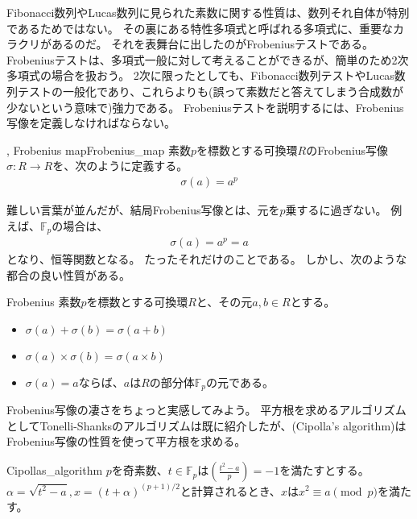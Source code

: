 Fibonacci数列やLucas数列に見られた素数に関する性質は、数列それ自体が特別であるためではない。
その裏にある特性多項式と呼ばれる多項式に、重要なカラクリがあるのだ。
それを表舞台に出したのがFrobeniusテストである。
Frobeniusテストは、多項式一般に対して考えることができるが、簡単のため2次多項式の場合を扱おう。
2次に限ったとしても、Fibonacci数列テストやLucas数列テストの一般化であり、これらよりも(誤って素数だと答えてしまう合成数が少ないという意味で)強力である。
Frobeniusテストを説明するには、Frobenius写像を定義しなければならない。

\begin{Defi}{, Frobenius map}{Frobenius_map}
素数$p$を標数とする可換環$R$のFrobenius写像$\sigma:R\to R$を、次のように定義する。
\begin{align*}
\sigma(a) = a^p
\end{align*}
\end{Defi}

難しい言葉が並んだが、結局Frobenius写像とは、元を$p$乗するに過ぎない。
例えば、$\mathbb{F}_p$の場合は、
\begin{align*}
\sigma(a) = a^p = a
\end{align*}
となり、恒等関数となる。
たったそれだけのことである。
しかし、次のような都合の良い性質がある。

\begin{Prop}{}{Frobenius}
素数$p$を標数とする可換環$R$と、その元$a,b\in R$とする。
\begin{itemize}
\item $\sigma(a) + \sigma(b) = \sigma(a + b)$
\item $\sigma(a) \times \sigma(b) = \sigma(a \times b)$
\item $\sigma(a) = a$ならば、$a$は$R$の部分体$\mathbb{F}_p$の元である。
\end{itemize}
\end{Prop}

Frobenius写像の凄さをちょっと実感してみよう。
平方根を求めるアルゴリズムとしてTonelli-Shanksのアルゴリズムは既に紹介したが、(Cipolla's algorithm)はFrobenius写像の性質を使って平方根を求める。

\begin{Prop}{}{Cipollas_algorithm}
$p$を奇素数、$t\in\mathbb{F}_p$は$\left(\frac{t^2-a}{p}\right)=-1$を満たすとする。
$\alpha=\sqrt{t^2-a}, x=(t+\alpha)^{(p+1)/2}$と計算されるとき、$x$は$x^2 \equiv a\pmod{p}$を満たす。
\end{Prop}

